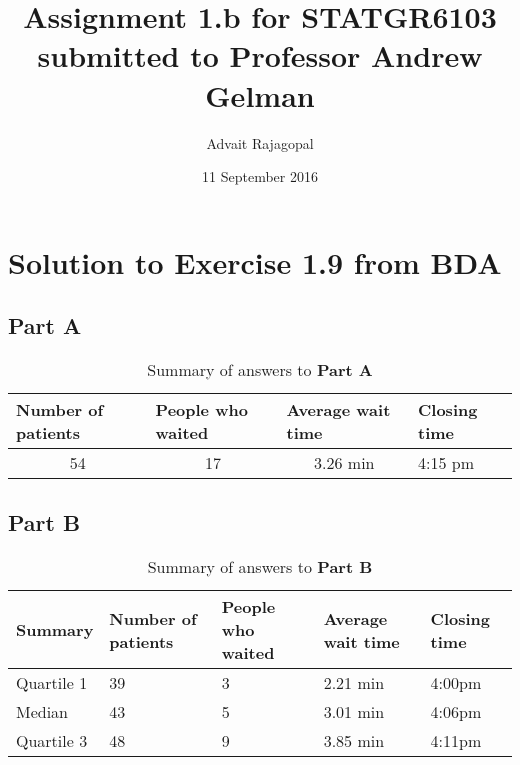 \documentclass{article}
\title{Assignment 1.b for \textbf{STATGR6103}\\
\large submitted to Professor Andrew Gelman}
\date{11 September 2016}
\author{Advait Rajagopal}
\begin{document}
  \maketitle
  

\section{Solution to Exercise 1.9 from BDA}
\subsection{Part A}
\begin{table}[H]
\centering
\caption{Summary of answers to \textbf{Part A}}
\label{my-label}
\begin{tabular}{|l|l|l|l|}
\hline
Number of patients       & People who waited & Average wait time             & Closing time \\ \hline
\multicolumn{1}{|c|}{54} & \multicolumn{1}{c|}{17}     & \multicolumn{1}{c|}{3.26 min} & 4:15 pm            \\ \hline
\end{tabular}
\end{table}

\subsection{Part B}
\begin{table}[H]
\centering
\caption{Summary of answers to \textbf{Part B}}
\label{my-label}
\begin{tabular}{|l|l|l|l|l|}
\hline
Summary & Number of patients & People who waited & Average wait time & Closing time \\ \hline
Quartile 1                           & 39                 & 3                           & 2.21 min             & 4:00pm              \\ \hline
Median                               & 43                 & 5                           & 3.01 min             & 4:06pm              \\ \hline
Quartile 3                           & 48                 & 9                           & 3.85 min            & 4:11pm              \\ \hline
\end{tabular}
\end{table}
\newpage
\end{document}
